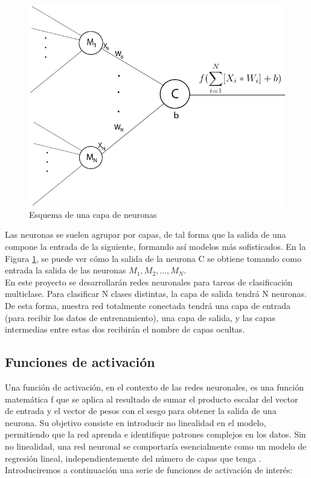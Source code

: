 \begin{figure}[H]
	\centering
	\includegraphics[scale=0.35]{imagenes/capa_neuronas.jpg}  
	\caption{Esquema de una capa de neuronas}
	\label{fig:capa_neuronas}
\end{figure}

Las neuronas se suelen agrupar por capas, de tal forma que la salida de una compone la entrada de la siguiente, formando así modelos más sofisticados. En la Figura \ref{fig:capa_neuronas}, se puede ver cómo la salida de la neurona C se obtiene tomando como entrada la salida de las neuronas $M_1, M_2, ..., M_N$.\\
En este proyecto se desarrollarán redes neuronales para tareas de clasificación multiclase. Para clasificar N clases distintas, la capa de salida tendrá N neuronas. De esta forma, nuestra red totalmente conectada tendrá una capa de entrada (para recibir los datos de entrenamiento), una capa de salida, y las capas intermedias entre estas dos recibirán el nombre de capas ocultas. 

\subsection{Funciones de activación}

Una función de activación, en el contexto de las redes neuronales, es una función matemática f que se aplica al resultado de sumar el producto escalar del vector de entrada y el vector de pesos con el sesgo para obtener la salida de una neurona. Su objetivo consiste en introducir no linealidad en el modelo, permitiendo que la red aprenda e identifique patrones complejos en los datos. Sin no linealidad, una red neuronal se comportaría esencialmente como un modelo de regresión lineal, independientemente del número de capas que tenga \cite{funcion_activacion_definicion}. Introduciremos a continuación una serie de funciones de activación de interés:

